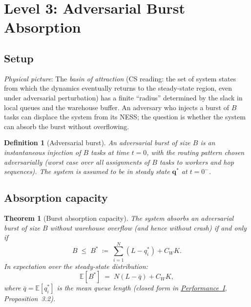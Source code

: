 \documentclass[11pt,a4paper]{report}
\newtheorem{theorem}{Theorem}[section]
\newtheorem{definition}{Definition}[section]
\newcommand{\qbar}{\bar{q}}
\begin{document}
\section{Level 3: Adversarial Burst Absorption}

\subsection{Setup}

\emph{Physical picture}:
The \emph{basin of attraction}
(CS reading: the set of system states from which the dynamics eventually
returns to the steady-state region, even under adversarial perturbation)
has a finite ``radius'' determined by the slack in local queues and the
warehouse buffer.
An adversary who injects a burst of $B$ tasks can displace the system
from its NESS; the question is whether the system can absorb the burst
without overflowing.

\begin{definition}[Adversarial burst]
An \emph{adversarial burst} of size $B$ is an instantaneous injection
of $B$ tasks at time $t = 0$, with the routing pattern chosen adversarially
(worst case over all assignments of $B$ tasks to workers and hop sequences).
The system is assumed to be in steady state $\mathbf{q}^*$ at $t = 0^-$.
\end{definition}

\subsection{Absorption capacity}

\begin{theorem}[Burst absorption capacity]
\label{thm:burst}
The system absorbs an adversarial burst of size $B$ without warehouse
overflow (and hence without crash) if and only if
\begin{equation}
  B \;\leq\; B^* \;\coloneqq\; \sum_{i=1}^N (L - q_i^*) + C_W K.
  \label{eq:burst-capacity}
\end{equation}
In expectation over the steady-state distribution:
\begin{equation}
  \mathbb{E}[B^*] \;=\; N(L - \qbar) + C_W K,
  \label{eq:burst-expect}
\end{equation}
where $\qbar = \mathbb{E}[q_i^*]$ is the mean queue length
(closed form in \hyperref[chap:load_balance]{Performance~I}, Proposition~3.2).
\end{theorem}
\end{document}
